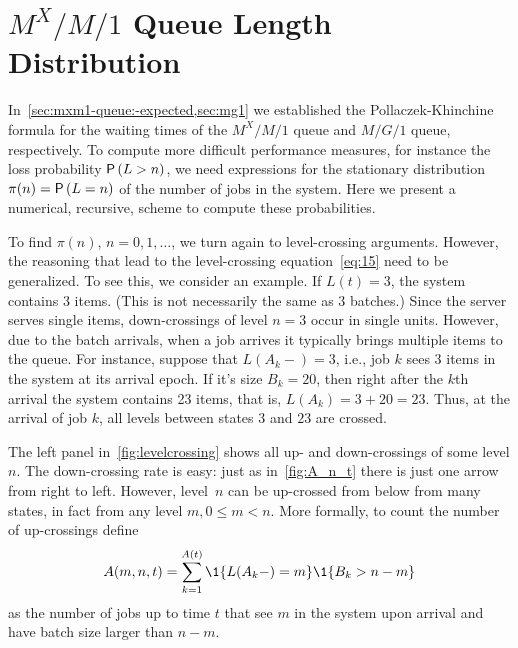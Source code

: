 \section{$M^X/M/1$ Queue Length Distribution}
\label{sec:batch-arrivals}





In~\cref{sec:mxm1-queue:-expected,sec:mg1} we established the Pollaczek-Khinchine formula for the waiting times of the $M^X/M/1$ queue and $M/G/1$ queue, respectively.
To compute more difficult performance measures, for instance the loss probability $\P{L>n}$, we need expressions for the stationary distribution $\pi(n)=\P{L=n}$ of the number of jobs in the system.
Here we present a numerical, recursive, scheme to compute these probabilities.

To find $\pi(n)$, $n=0, 1, \ldots$, we turn again to level-crossing arguments.
However, the reasoning that lead to the level-crossing equation~\cref{eq:15} need to be generalized.
To see this, we consider an example.
If $L(t)=3$, the system contains $3$ items.
(This is not necessarily the same as 3 batches.)
Since the server serves single items, down-crossings of level $n=3$ occur in single units.
However, due to the batch arrivals, when a job arrives it typically brings multiple items to the queue.
For instance, suppose that $L(A_k-) = 3$, i.e., job $k$ sees 3 items in the system at its arrival epoch.
If it's size $B_k = 20$, then right after the $k$th arrival the system contains 23 items, that is, $L(A_k)=3+20=23$.
Thus, at the arrival of job $k$, all levels between states $3$ and $23$ are crossed.

The left panel in~\cref{fig:levelcrossing} shows all up- and down-crossings of some level $n$.
The down-crossing rate is easy: just as in~\cref{fig:A_n_t} there is just one arrow from right to left.
However, level~$n$ can be up-crossed from below from many states, in fact from any level $m, 0\leq m <n$.
More formally, to count the number of up-crossings define
\begin{equation*}
  A(m,n,t) = \sum_{k=1}^{A(t)}\1{L(A_k-) = m}\1{B_k > n-m}
\end{equation*}
as the number of jobs up to time $t$ that see $m$ in the system upon arrival and have batch size larger than $n-m$.


